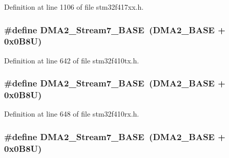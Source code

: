 Definition at line 1106 of file stm32f417xx.\+h.

\subsubsection[{\texorpdfstring{D\+M\+A2\+\_\+\+Stream7\+\_\+\+B\+A\+SE}{DMA2_Stream7_BASE}}]{\setlength{\rightskip}{0pt plus 5cm}\#define D\+M\+A2\+\_\+\+Stream7\+\_\+\+B\+A\+SE~({\bf D\+M\+A2\+\_\+\+B\+A\+SE} + 0x0\+B8\+U)}\hypertarget{group___peripheral__registers__structures_gaa9faa708ad2440d24eb1064cba9bb06d}{}\label{group___peripheral__registers__structures_gaa9faa708ad2440d24eb1064cba9bb06d}


Definition at line 642 of file stm32f410tx.\+h.

\subsubsection[{\texorpdfstring{D\+M\+A2\+\_\+\+Stream7\+\_\+\+B\+A\+SE}{DMA2_Stream7_BASE}}]{\setlength{\rightskip}{0pt plus 5cm}\#define D\+M\+A2\+\_\+\+Stream7\+\_\+\+B\+A\+SE~({\bf D\+M\+A2\+\_\+\+B\+A\+SE} + 0x0\+B8\+U)}\hypertarget{group___peripheral__registers__structures_gaa9faa708ad2440d24eb1064cba9bb06d}{}\label{group___peripheral__registers__structures_gaa9faa708ad2440d24eb1064cba9bb06d}


Definition at line 648 of file stm32f410rx.\+h.

\subsubsection[{\texorpdfstring{D\+M\+A2\+\_\+\+Stream7\+\_\+\+B\+A\+SE}{DMA2_Stream7_BASE}}]{\setlength{\rightskip}{0pt plus 5cm}\#define D\+M\+A2\+\_\+\+Stream7\+\_\+\+B\+A\+SE~({\bf D\+M\+A2\+\_\+\+B\+A\+SE} + 0x0\+B8\+U)}\hypertarget{group___peripheral__registers__structures_gaa9faa708ad2440d24eb1064cba9bb06d}{}\label{group___peripheral__registers__structures_gaa9faa708ad2440d24eb1064cba9bb06d}


